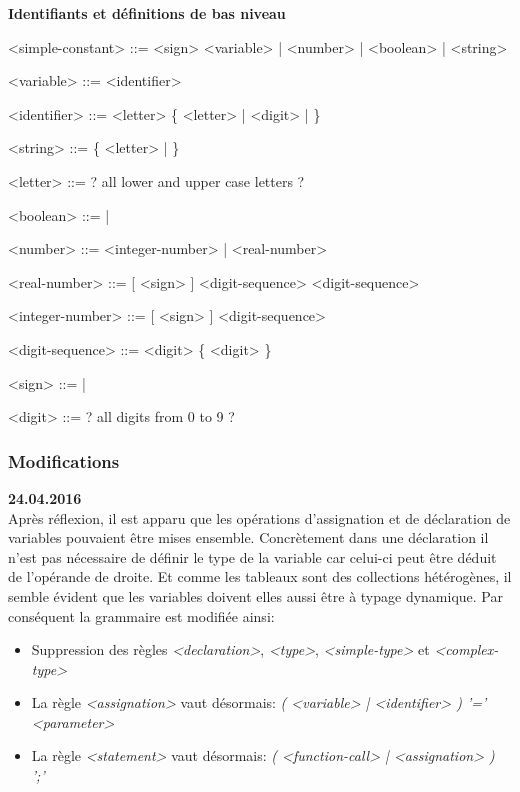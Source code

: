 \documentclass[french]{article}
\begin{document}
				\textbf{Identifiants et définitions de bas niveau}
				\begin{grammar}
					<simple-constant> ::= <sign> <variable> | <number> | <boolean> | <string>
					
					<variable> ::= <identifier>
					
					<identifier> ::= <letter> \{ <letter> | <digit> | \lit{\_} \}
					
					<string> ::=  \{ <letter> | \lit{ } \} 
					
					<letter> ::= ? all lower and upper case letters ? 
					
					<boolean> ::=  | 
					
					<number> ::= <integer-number> | <real-number>
					
					<real-number> ::= [ <sign> ] <digit-sequence>  <digit-sequence>
					
					<integer-number> ::= [ <sign> ] <digit-sequence>
					
					<digit-sequence> ::= <digit> \{ <digit> \}
					
					<sign> ::= \lit{+} | \lit{-} 
					
					<digit> ::= ? all digits from 0 to 9 ? 
				\end{grammar}
				
			\subsubsection{Modifications}
				\textbf{24.04.2016}\\
				Après réflexion, il est apparu que les opérations d'assignation et de déclaration de variables pouvaient être mises ensemble. Concrètement dans une déclaration il n'est pas nécessaire de définir le type de la variable car celui-ci peut être déduit de l'opérande de droite. Et comme les tableaux sont des collections hétérogènes, il semble évident que les variables doivent elles aussi être à typage dynamique. Par conséquent la grammaire est modifiée ainsi:
				\begin{itemize}
					\item Suppression des règles \textit{<declaration>}, \textit{<type>}, \textit{<simple-type>} et \textit{<complex-type>}
					\item La règle \textit{<assignation>} vaut désormais: \textit{( <variable> | <identifier> ) '=' <parameter>}
					\item La règle \textit{<statement>} vaut désormais: \textit{( <function-call> | <assignation> ) ';'}
				\end{itemize} 
				
\end{document}
